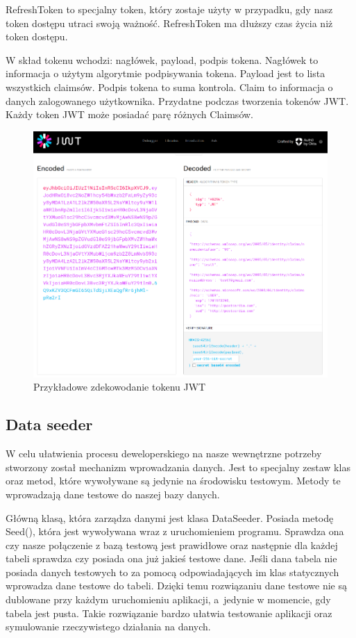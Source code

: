 \documentclass[a4paper,twoside,12pt]{book}
\begin{document}
RefreshToken to specjalny token, który zostaje użyty w przypadku, gdy nasz token dostępu utraci swoją ważność. RefreshToken ma dłuższy czas życia niż token dostępu. 

W skład tokenu wchodzi: nagłówek, payload, podpis tokena. Nagłówek to informacja o użytym algorytmie podpisywania tokena. Payload jest to lista wszystkich claimsów. Podpis tokena to suma kontrola. Claim to informacja o danych zalogowanego użytkownika. Przydatne podczas tworzenia tokenów JWT. Każdy token JWT może posiadać parę różnych Claimsów.  

\begin{figure}[H]
    \centering
    \includegraphics[width=1\textwidth]{jwtdecode.png}
    \caption{Przykładowe zdekowodanie tokenu JWT }
    \label{JWTDecode}
\end{figure}

\subsection{Data seeder} 
W celu ułatwienia procesu deweloperskiego na nasze wewnętrzne potrzeby stworzony został mechanizm wprowadzania danych. Jest to specjalny zestaw klas oraz metod, które wywoływane są jedynie na środowisku testowym. Metody te wprowadzają dane testowe do naszej bazy danych.  

Główną klasą, która zarządza danymi jest klasa DataSeeder. Posiada metodę Seed(), która jest wywoływana wraz z uruchomieniem programu. Sprawdza ona czy nasze połączenie z bazą testową jest prawidłowe oraz następnie dla każdej tabeli sprawdza czy posiada ona już jakieś testowe dane. Jeśli dana tabela nie posiada danych testowych to za pomocą odpowiadających im klas statycznych wprowadza dane testowe do tabeli. Dzięki temu rozwiązaniu dane testowe nie są dublowane przy każdym uruchomieniu aplikacji, a~jedynie w momencie, gdy tabela jest pusta. Takie rozwiązanie bardzo ułatwia testowanie aplikacji oraz symulowanie rzeczywistego działania na danych. 
\end{document}
